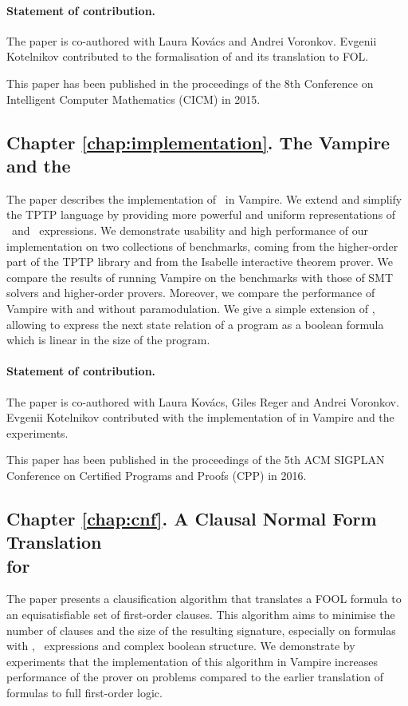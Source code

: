 \paragraph{Statement of contribution.} The paper is co-authored with Laura Kov\'{a}cs and Andrei Voronkov. Evgenii Kotelnikov contributed to the formalisation of \folb{} and its translation to FOL.

This paper has been published in the proceedings of the 8th Conference on Intelligent Computer Mathematics (CICM) in 2015.

\subsection*{Chapter \ref{chap:implementation}. The Vampire and the \folb{}}
The paper describes the implementation of \folb\ in Vampire. We extend and simplify the TPTP language by providing more powerful and uniform representations of \ITE\ and \LETIN\ expressions. We demonstrate usability and high performance of our implementation on two collections of benchmarks, coming from the higher-order part of the TPTP library and from the Isabelle interactive theorem prover. We compare the results of running Vampire on the benchmarks with those of SMT solvers and higher-order provers. Moreover, we compare the performance of Vampire with and without \folb{} paramodulation. We give a simple extension of \folb, allowing to express the next state relation of a program as a boolean formula which is linear in the size of the program.

\paragraph{Statement of contribution.} The paper is co-authored with Laura Kov\'{a}cs, Giles Reger and Andrei Voronkov. Evgenii Kotelnikov contributed with the implementation of \folb{} in Vampire and the experiments.

This paper has been published in the proceedings of the 5th ACM SIGPLAN Conference on Certified Programs and Proofs (CPP) in 2016.

\subsection*{Chapter \ref{chap:cnf}. A Clausal Normal Form Translation\\for \folb{}}
The paper presents a clausification algorithm that translates a FOOL formula to an equisatisfiable set of first-order clauses. This algorithm aims to minimise the number of clauses and the size of the resulting signature, especially on formulas with \ITE, \LETIN\ expressions and complex boolean structure. We demonstrate by experiments that the implementation of this algorithm in Vampire increases performance of the prover on \folb{} problems compared to the earlier translation of \folb{} formulas to full first-order logic.

